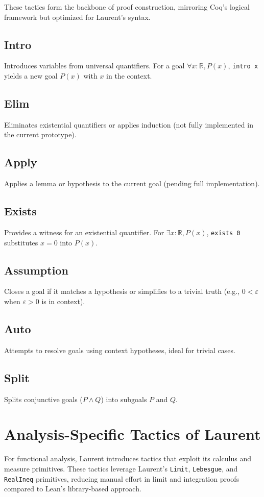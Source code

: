 \documentclass{article}
\begin{document}
These tactics form the backbone of proof construction,
 mirroring Coq’s logical framework but optimized for Laurent’s syntax.

\subsection{Intro}
Introduces variables from universal quantifiers. For a goal $\forall x : \mathbb{R}, P(x)$, \texttt{intro x} yields a new goal $P(x)$ with $x$ in the context.

\subsection{Elim}
Eliminates existential quantifiers or applies induction (not fully implemented in the current prototype).

\subsection{Apply}
Applies a lemma or hypothesis to the current goal (pending full implementation).

\subsection{Exists}
Provides a witness for an existential quantifier. For $\exists x : \mathbb{R}, P(x)$, \texttt{exists 0} substitutes $x = 0$ into $P(x)$.

\subsection{Assumption}
Closes a goal if it matches a hypothesis or simplifies to a trivial truth (e.g., $0 < \varepsilon$ when $\varepsilon > 0$ is in context).

\subsection{Auto}
Attempts to resolve goals using context hypotheses, ideal for trivial cases.

\subsection{Split}
Splits conjunctive goals ($P \land Q$) into subgoals $P$ and $Q$.

\section{Analysis-Specific Tactics of Laurent}
For functional analysis, Laurent introduces tactics that exploit its calculus and measure primitives.
These tactics leverage Laurent’s \texttt{Limit}, \texttt{Lebesgue}, and \texttt{RealIneq} primitives,
reducing manual effort in limit and integration proofs compared to Lean’s library-based approach.
\end{document}
